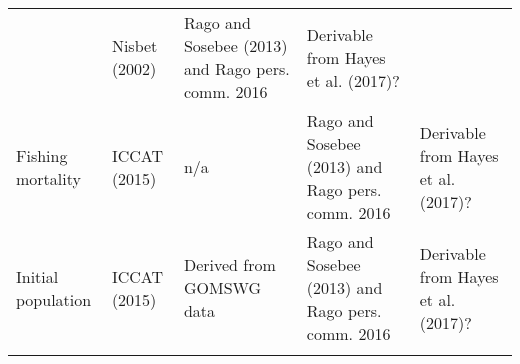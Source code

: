 \documentclass[]{article}
\begin{document}
\begin{longtable}[]{@{}lllll@{}}
\begin{minipage}[t]{0.17\columnwidth}
\end{minipage} & \begin{minipage}[t]{0.17\columnwidth}\raggedright\strut
Nisbet (2002)\strut
\end{minipage} & \begin{minipage}[t]{0.17\columnwidth}\raggedright\strut
Rago and Sosebee (2013) and Rago pers. comm. 2016\strut
\end{minipage} & \begin{minipage}[t]{0.17\columnwidth}\raggedright\strut
Derivable from Hayes et al. (2017)?\strut
\end{minipage}\tabularnewline
\begin{minipage}[t]{0.17\columnwidth}\raggedright\strut
Fishing mortality\strut
\end{minipage} & \begin{minipage}[t]{0.17\columnwidth}\raggedright\strut
ICCAT (2015)\strut
\end{minipage} & \begin{minipage}[t]{0.17\columnwidth}\raggedright\strut
n/a\strut
\end{minipage} & \begin{minipage}[t]{0.17\columnwidth}\raggedright\strut
Rago and Sosebee (2013) and Rago pers. comm. 2016\strut
\end{minipage} & \begin{minipage}[t]{0.17\columnwidth}\raggedright\strut
Derivable from Hayes et al. (2017)?\strut
\end{minipage}\tabularnewline
\begin{minipage}[t]{0.17\columnwidth}\raggedright\strut
Initial population\strut
\end{minipage} & \begin{minipage}[t]{0.17\columnwidth}\raggedright\strut
ICCAT (2015)\strut
\end{minipage} & \begin{minipage}[t]{0.17\columnwidth}\raggedright\strut
Derived from GOMSWG data\strut
\end{minipage} & \begin{minipage}[t]{0.17\columnwidth}\raggedright\strut
Rago and Sosebee (2013) and Rago pers. comm. 2016\strut
\end{minipage} & \begin{minipage}[t]{0.17\columnwidth}\raggedright\strut
Derivable from Hayes et al. (2017)?\strut
\end{minipage}\tabularnewline
\begin{minipage}[t]{0.17\columnwidth}\raggedright\strut

\end{minipage}
\end{longtable}
\end{document}
